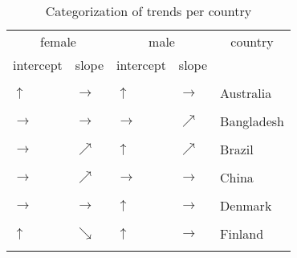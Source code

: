 \begin{table}[!h]

\caption{\label{tab:}Categorization of trends per country}
\centering
\begin{tabular}[t]{lllll}
\toprule
\multicolumn{2}{c}{female} & \multicolumn{2}{c}{male} & \multicolumn{1}{c}{country} \\
\cmidrule(l{3pt}r{3pt}){1-2} \cmidrule(l{3pt}r{3pt}){3-4} \cmidrule(l{3pt}r{3pt}){5-5}
intercept & slope & intercept & slope & \\
\midrule
\cellcolor{gray!6}{$\rightarrow$} & \cellcolor{gray!6}{$\nearrow$} & \cellcolor{gray!6}{$\uparrow$} & \cellcolor{gray!6}{$\rightarrow$} & \cellcolor{gray!6}{Argentina}\\
$\uparrow$ & $\rightarrow$ & $\uparrow$ & $\rightarrow$ & Australia\\
\cellcolor{gray!6}{$\rightarrow$} & \cellcolor{gray!6}{$\rightarrow$} & \cellcolor{gray!6}{$\uparrow$} & \cellcolor{gray!6}{$\rightarrow$} & \cellcolor{gray!6}{Austria}\\
$\rightarrow$ & $\rightarrow$ & $\rightarrow$ & $\nearrow$ & Bangladesh\\
\cellcolor{gray!6}{$\rightarrow$} & \cellcolor{gray!6}{$\searrow$} & \cellcolor{gray!6}{$\uparrow$} & \cellcolor{gray!6}{$\rightarrow$} & \cellcolor{gray!6}{Belgium}\\
\addlinespace
$\rightarrow$ & $\nearrow$ & $\uparrow$ & $\nearrow$ & Brazil\\
\cellcolor{gray!6}{$\uparrow$} & \cellcolor{gray!6}{$\rightarrow$} & \cellcolor{gray!6}{$\uparrow$} & \cellcolor{gray!6}{$\rightarrow$} & \cellcolor{gray!6}{Canada}\\
$\rightarrow$ & $\nearrow$ & $\rightarrow$ & $\rightarrow$ & China\\
\cellcolor{gray!6}{$\uparrow$} & \cellcolor{gray!6}{$\searrow$} & \cellcolor{gray!6}{$\uparrow$} & \cellcolor{gray!6}{$\nearrow$} & \cellcolor{gray!6}{Colombia}\\
$\rightarrow$ & $\rightarrow$ & $\uparrow$ & $\rightarrow$ & Denmark\\
\addlinespace
\cellcolor{gray!6}{$\rightarrow$} & \cellcolor{gray!6}{$\rightarrow$} & \cellcolor{gray!6}{$\uparrow$} & \cellcolor{gray!6}{$\rightarrow$} & \cellcolor{gray!6}{Egypt}\\
$\uparrow$ & $\searrow$ & $\uparrow$ & $\rightarrow$ & Finland\\
\cellcolor{gray!6}{$\uparrow$} & \cellcolor{gray!6}{$\searrow$} & \cellcolor{gray!6}{$\uparrow$} & \cellcolor{gray!6}{$\rightarrow$} & \cellcolor{gray!6}{France}\\

\end{tabular}
\end{table}
